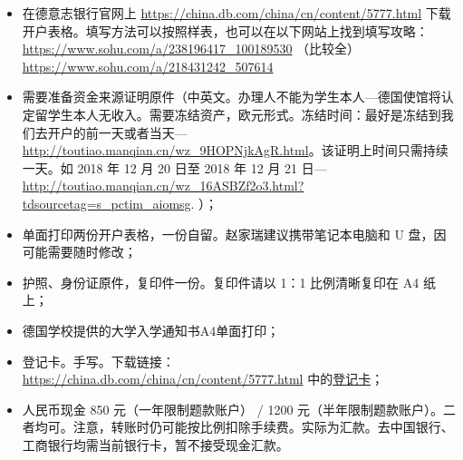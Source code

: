 \documentclass{article}
\begin{document}
\begin{itemize}
\item 在德意志银行官网上 \url{https://china.db.com/china/cn/content/5777.html} 下载开户表格。填写方法可以按照样表，也可以在以下网站上找到填写攻略：\\
\url{https://www.sohu.com/a/238196417_100189530} （比较全）\\
\url{https://www.sohu.com/a/218431242_507614}
\item 需要准备资金来源证明原件（中英文。办理人不能为学生本人---德国使馆将认定留学生本人无收入。需要冻结资产，欧元形式。冻结时间：最好是冻结到我们去开户的前一天或者当天---\url{http://toutiao.manqian.cn/wz_9HOPNjkAgR.html}。该证明上时间只需持续一天。如 2018 年 12 月 20 日至 2018 年 12 月 21 日---\url{http://toutiao.manqian.cn/wz_16ASBZf2o3.html?tdsourcetag=s_pctim_aiomsg}. ）；
\item 单面打印两份开户表格，一份自留。赵家瑞建议携带笔记本电脑和 U 盘，因可能需要随时修改；
\item 护照、身份证原件，复印件一份。复印件请以 1：1 比例清晰复印在 A4 纸上；
\item 德国学校提供的大学入学通知书A4单面打印；
\item 登记卡。手写。下载链接： \url{https://china.db.com/china/cn/content/5777.html} 中的\href{https://china.db.com/china/docs/Deutsche_Bank-China-Account-Opening-Process-And-Introduction.pdf}{登记卡}；
\item 人民币现金 850 元（一年限制题款账户） / 1200 元（半年限制题款账户）。二者均可。注意，转账时仍可能按比例扣除手续费。实际为汇款。去中国银行、工商银行均需当前银行卡，暂不接受现金汇款。
\end{itemize}
\end{document}
